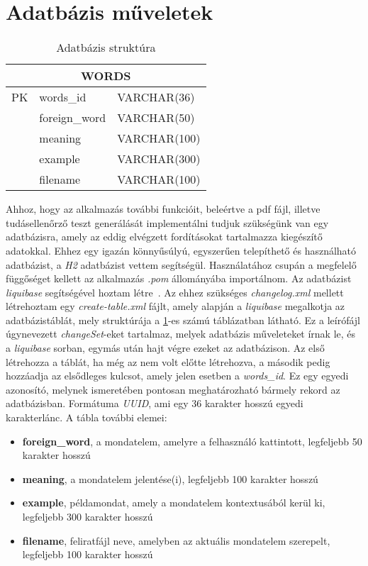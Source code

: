 \section{Adatbázis műveletek}

\begin{table}[h!]
\centering
\begin{tabular}{ |p{1cm}|p{3cm}p{3cm}|  }
\hline
\multicolumn{3}{|c|}{WORDS} \\
\hline
 PK & words\_id & VARCHAR(36) \\
 \hline
  & foreign\_word & VARCHAR(50) \\
  & meaning & VARCHAR(100) \\
  & example & VARCHAR(300) \\
  & filename & VARCHAR(100) \\
\hline
\end{tabular}
\caption{Adatbázis struktúra}
\label{table:adatbazis}
\end{table}

Ahhoz, hogy az alkalmazás további funkcióit, beleértve a pdf fájl, illetve tudásellenőrző teszt generálását implementálni tudjuk szükségünk van egy adatbázisra, amely az eddig elvégzett fordításokat tartalmazza kiegészítő adatokkal. Ehhez egy igazán könnyűsúlyú, egyszerűen telepíthető és használható adatbázist, a \textit{H2} adatbázist vettem segítségül. Használatához csupán a megfelelő függőséget kellett az alkalmazás \textit{.pom} állományába importálnom. Az adatbázist \textit{liquibase} segítségével hoztam létre~\cite{Liquibase}.
Az ehhez szükséges \textit{changelog.xml} mellett létrehoztam egy \textit{create-table.xml} fájlt, amely alapján a \textit{liquibase} megalkotja az adatbázistáblát, mely struktúrája a \ref{table:adatbazis}-es számú táblázatban látható. Ez a leírófájl 
úgynevezett \textit{changeSet}-eket tartalmaz, melyek adatbázis műveleteket írnak le, és a \textit{liquibase} sorban, egymás után hajt végre ezeket az adatbázison. Az első létrehozza a táblát, ha még az nem volt előtte létrehozva, a második pedig hozzáadja az elsődleges kulcsot, amely jelen esetben a \textit{words\_id}. Ez egy egyedi azonosító, melynek ismeretében pontosan meghatározható bármely rekord az adatbázisban. Formátuma \textit{UUID}, ami egy 36 karakter hosszú egyedi karakterlánc. A tábla további elemei:
\begin{itemize}
\item \textbf{ foreign\_word}, a mondatelem, amelyre a felhasználó kattintott, legfeljebb 50 karakter hosszú
\item \textbf{meaning}, a mondatelem jelentése(i), legfeljebb 100 karakter hosszú
\item \textbf{example}, példamondat, amely a mondatelem kontextusából kerül ki, legfeljebb 300 karakter hosszú
\item \textbf{filename}, feliratfájl neve, amelyben az aktuális mondatelem szerepelt, legfeljebb 100 karakter hosszú
\end{itemize}

